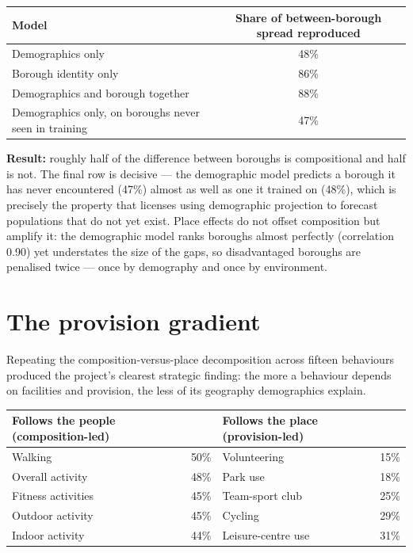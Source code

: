 \documentclass[ %
                    author={Ashrey Ashrey, Sanya Kapoor, Trisha Sharma, Yash Bhooshan Pandloskar},
                supervisor={Dr. Dalila O’Grady},
                    degree={MSc},
                     title={Using machine learning to forecast physical activity participation, volunteering and activity patterns in London},
                  subtitle={},
                      type={},
                      year={2021}]{dissertation}
\begin{document}
\begin{table}[!htb]
\centering
\begin{tabularx}{\textwidth}{@{}Xc@{}}
\toprule
\textbf{Model} & \textbf{Share of between-borough spread reproduced} \\
\midrule
Demographics only & 48\% \\
Borough identity only & 86\% \\
Demographics and borough together & 88\% \\
Demographics only, on boroughs never seen in training & 47\% \\
\bottomrule
\end{tabularx}
\end{table}

\noindent
\textbf{Result:} roughly half of the difference between boroughs is compositional and half is not. The final row is decisive --- the demographic model predicts a borough it has never encountered (47\%) almost as well as one it trained on (48\%), which is precisely the property that licenses using demographic projection to forecast populations that do not yet exist. Place effects do not offset composition but amplify it: the demographic model ranks boroughs almost perfectly (correlation 0.90) yet understates the size of the gaps, so disadvantaged boroughs are penalised twice --- once by demography and once by environment.

\section{The provision gradient}

\noindent
Repeating the composition-versus-place decomposition across fifteen behaviours produced the project's clearest strategic finding: the more a behaviour depends on facilities and provision, the less of its geography demographics explain.

\begin{table}[!htb]
\centering
\begin{tabular}{lclc}
\toprule
\textbf{Follows the people (composition-led)} & & \textbf{Follows the place (provision-led)} & \\
\midrule
Walking & 50\% & Volunteering & 15\% \\
Overall activity & 48\% & Park use & 18\% \\
Fitness activities & 45\% & Team-sport club & 25\% \\
Outdoor activity & 45\% & Cycling & 29\% \\
Indoor activity & 44\% & Leisure-centre use & 31\% \\
\bottomrule
\end{tabular}
\end{table}
\end{document}
